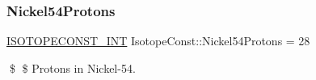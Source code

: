 \subsubsection{\texorpdfstring{Nickel54\+Protons}{Nickel54Protons}}
{\footnotesize\ttfamily \mbox{\hyperlink{group___isotope_const-_macros_ga5f18360b3e99483a35c32d789e62621c}{I\+S\+O\+T\+O\+P\+E\+C\+O\+N\+S\+T\+\_\+\+I\+NT}} Isotope\+Const\+::\+Nickel54\+Protons = 28}

\$ \$ Protons in Nickel-\/54. 